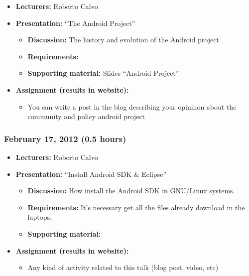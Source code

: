 \documentclass[a4paper]{article}
\begin{document}
\begin{itemize}
\item \textbf{Lecturers:} Roberto Calvo
\item \textbf{Presentation:} ``The Android Project''
  \begin{itemize}
  \item \textbf{Discussion:} The history and evolution of the Android
    project
  \item \textbf{Requirements:} 
  \item \textbf{Supporting material:} Slides ``Android Project''
  \end{itemize}
\item \textbf{Assignment (results in website):}
  \begin{itemize}
  \item You can write a post in the blog describing your opininon
    about the community and policy android project
  \end{itemize}
\end{itemize}


\subsubsection{February 17, 2012 (0.5 hours)}

\begin{itemize}
\item \textbf{Lecturers:} Roberto Calvo
\item \textbf{Presentation:} ``Install Android SDK \& Eclipse''
  \begin{itemize}
  \item \textbf{Discussion:} How install the Android SDK in GNU/Linux
    systems.
  \item \textbf{Requirements:} It's necessary get all the files
    already download in the laptops.
  \item \textbf{Supporting material:}
  \end{itemize}
\item \textbf{Assignment (results in website):}
  \begin{itemize}
  \item Any kind of activity
    related to this talk (blog post, video, etc)
  \end{itemize}
\end{itemize}
\end{document}
